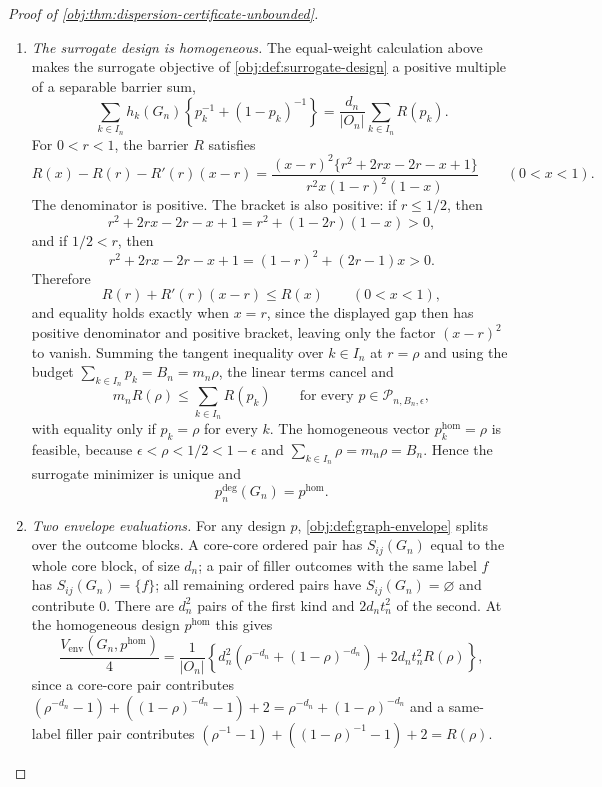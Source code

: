 \begin{proof}[Proof of \cref{obj:thm:dispersion-certificate-unbounded}]
\begin{enumerate}
\item \textit{The surrogate design is homogeneous.}  The equal-weight calculation above makes the surrogate objective of \cref{obj:def:surrogate-design} a positive multiple of a separable barrier sum,
\[
\sum_{k\in I_n}h_k(G_n)\left\{p_k^{-1}+(1-p_k)^{-1}\right\}
=\frac{d_n}{|O_n|}\sum_{k\in I_n}R(p_k).
\]
For \(0<r<1\), the barrier \(R\) satisfies
\[
R(x)-R(r)-R'(r)(x-r)
=
\frac{(x-r)^2\{r^2+2rx-2r-x+1\}}
{r^2x(1-r)^2(1-x)}
\qquad(0<x<1).
\]
The denominator is positive.  The bracket is also positive: if \(r\leq1/2\), then
\[
r^2+2rx-2r-x+1=r^2+(1-2r)(1-x)>0,
\]
and if \(1/2<r\), then
\[
r^2+2rx-2r-x+1=(1-r)^2+(2r-1)x>0.
\]
Therefore
\[
R(r)+R'(r)(x-r)\leq R(x)
\qquad(0<x<1),
\]
and equality holds exactly when \(x=r\), since the displayed gap then has positive denominator and positive bracket, leaving only the factor \((x-r)^2\) to vanish.
Summing the tangent inequality over \(k\in I_n\) at \(r=\rho\) and using the budget \(\sum_{k\in I_n}p_k=B_n=m_n\rho\), the linear terms cancel and
\[
m_nR(\rho)\leq\sum_{k\in I_n}R(p_k)
\qquad\text{for every }p\in\mathcal P_{n,B_n,\epsilon},
\]
with equality only if \(p_k=\rho\) for every \(k\).  The homogeneous vector \(p^{\mathrm{hom}}_k=\rho\) is feasible, because \(\epsilon<\rho<1/2<1-\epsilon\) and \(\sum_{k\in I_n}\rho=m_n\rho=B_n\).  Hence the surrogate minimizer is unique and
\[
p_n^{\deg}(G_n)=p^{\mathrm{hom}} .
\]

\item \textit{Two envelope evaluations.}  For any design \(p\), \cref{obj:def:graph-envelope} splits over the outcome blocks.  A core-core ordered pair has \(S_{ij}(G_n)\) equal to the whole core block, of size \(d_n\); a pair of filler outcomes with the same label \(f\) has \(S_{ij}(G_n)=\{f\}\); all remaining ordered pairs have \(S_{ij}(G_n)=\varnothing\) and contribute \(0\).  There are \(d_n^2\) pairs of the first kind and \(2d_nt_n^2\) of the second.  At the homogeneous design \(p^{\mathrm{hom}}\) this gives
\[
\frac{V_{\mathrm{env}}(G_n,p^{\mathrm{hom}})}{4}
=\frac{1}{|O_n|}
\left\{
d_n^2\left(\rho^{-d_n}+(1-\rho)^{-d_n}\right)
+2d_nt_n^2R(\rho)
\right\},
\]
since a core-core pair contributes \((\rho^{-d_n}-1)+((1-\rho)^{-d_n}-1)+2=\rho^{-d_n}+(1-\rho)^{-d_n}\) and a same-label filler pair contributes \((\rho^{-1}-1)+((1-\rho)^{-1}-1)+2=R(\rho)\).


\end{enumerate}
\end{proof}
